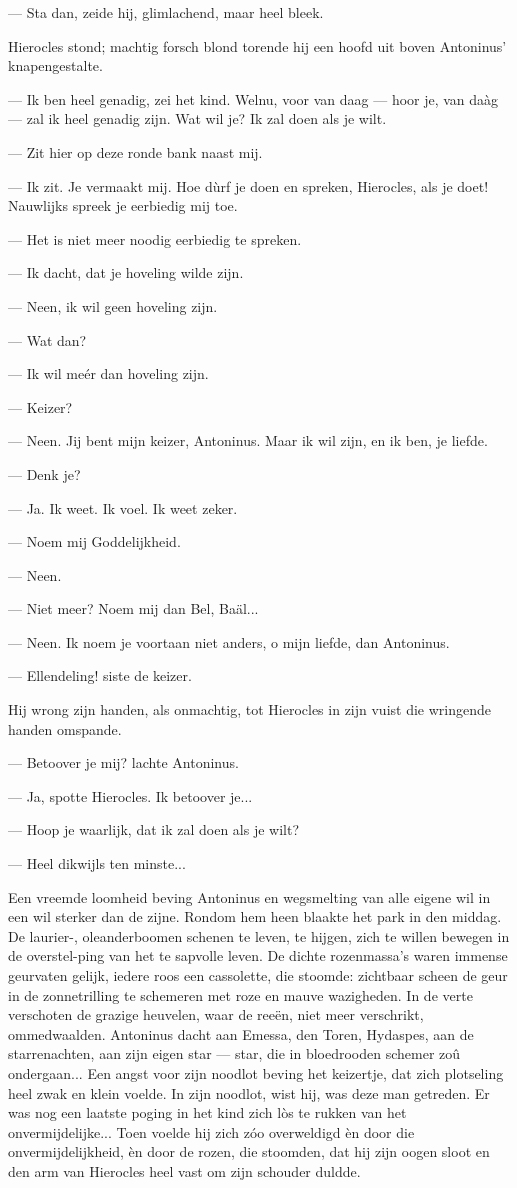 \documentclass[a4paper, 12pt, oneside, dutch]{article}
\begin{document}
--- Sta dan, zeide hij, glimlachend, maar heel bleek.

Hierocles stond; machtig forsch blond torende hij een hoofd uit boven Antoninus' knapengestalte.

--- Ik ben heel genadig, zei het kind. Welnu, voor van daag --- hoor je, van daàg --- zal ik heel genadig zijn. Wat wil je? Ik zal doen als je wilt.

--- Zit hier op deze ronde bank naast mij.

--- Ik zit. Je vermaakt mij. Hoe dùrf je doen en spreken, Hierocles, als je doet! Nauwlijks spreek je eerbiedig mij toe.

--- Het is niet meer noodig eerbiedig te spreken.

--- Ik dacht, dat je hoveling wilde zijn.

--- Neen, ik wil geen hoveling zijn.

--- Wat dan?

--- Ik wil meér dan hoveling zijn.

--- Keizer?

--- Neen. Jij bent mijn keizer, Antoninus. Maar ik wil zijn, en ik ben, je liefde.

--- Denk je?

--- Ja. Ik weet. Ik voel. Ik weet zeker.

--- Noem mij Goddelijkheid.

--- Neen.

--- Niet meer? Noem mij dan Bel, Baäl...

--- Neen. Ik noem je voortaan niet anders, o mijn liefde, dan Antoninus.

--- Ellendeling! siste de keizer.

Hij wrong zijn handen, als onmachtig, tot Hierocles in zijn vuist die wringende handen omspande.

--- Betoover je mij? lachte Antoninus.

--- Ja, spotte Hierocles. Ik betoover je...

--- Hoop je waarlijk, dat ik zal doen als je wilt?

--- Heel dikwijls ten minste...

Een vreemde loomheid beving Antoninus en wegsmelting van alle eigene wil in een wil sterker dan de zijne. Rondom hem heen blaakte het park in den middag. De laurier-, oleanderboomen schenen te leven, te hijgen, zich te willen bewegen in de overstel-ping van het te sapvolle leven. De dichte rozenmassa's waren immense geurvaten gelijk, iedere roos een cassolette, die stoomde: zichtbaar scheen de geur in de zonnetrilling te schemeren met roze en mauve wazigheden. In de verte verschoten de grazige heuvelen, waar de reeën, niet meer verschrikt, ommedwaalden. Antoninus dacht aan Emessa, den Toren, Hydaspes, aan de starrenachten, aan zijn eigen star --- star, die in bloedrooden schemer zoû ondergaan... Een angst voor zijn noodlot beving het keizertje, dat zich plotseling heel zwak en klein voelde. In zijn noodlot, wist hij, was deze man getreden. Er was nog een laatste poging in het kind zich lòs te rukken van het onvermijdelijke... Toen voelde hij zich zóo overweldigd èn door die onvermijdelijkheid, èn door de rozen, die stoomden, dat hij zijn oogen sloot en den arm van Hierocles heel vast om zijn schouder duldde.
\end{document}
